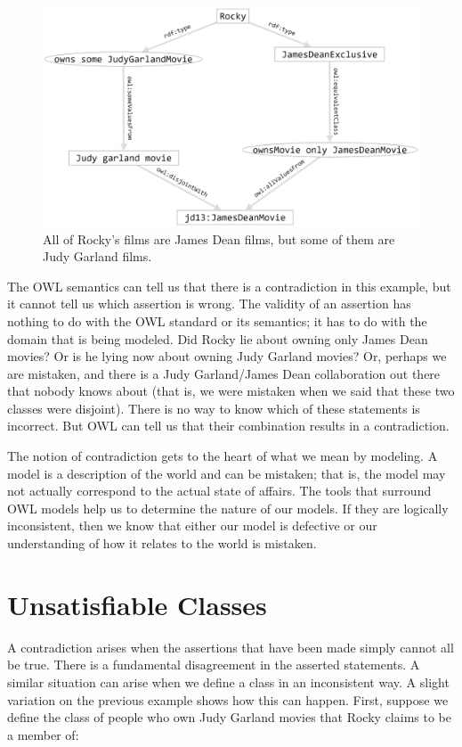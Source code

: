 \begin{figure}
\centering
\includegraphics[width=5in]{SWWOv3/media/ch13/figure13-7.png}
\caption{All of Rocky's films are James Dean films, but some of them are Judy
Garland films.
}
\label{fig:ch13.07}
\end{figure}



The OWL semantics can tell us that there is a contradiction in this
example, but it cannot tell us which assertion is wrong. The validity of
an assertion has nothing to do with the OWL standard or its semantics;
it has to do with the domain that is being modeled. Did Rocky lie about
owning only James Dean movies? Or is he lying now about owning Judy
Garland movies? Or, perhaps we are mistaken, and there is a Judy
Garland/James Dean collaboration out there that nobody knows about (that
is, we were mistaken when we said that these two classes were disjoint).
There is no way to know which of these statements is incorrect. But OWL
can tell us that their combination results in a contradiction.

The notion of contradiction gets to the heart of what we mean by
modeling. A model is a description of the world and can be mistaken;
that is, the model may not actually correspond to the actual state of
affairs. The tools that surround OWL models help us to determine the
nature of our models. If they are logically inconsistent, then we know
that either our model is defective or our understanding of how it
relates to the world is mistaken.

\section{Unsatisfiable Classes}

A contradiction arises when the assertions that have been made simply
cannot all be true. There is a fundamental disagreement in the asserted
statements. A similar situation can arise when we define a class in an
inconsistent way. A slight variation on the previous example shows how
this can happen. First, suppose we define the class of people who own
Judy Garland movies that Rocky claims to be a member of:

